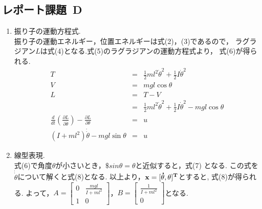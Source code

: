 \documentclass[twocolumn, 10pt,a4j]{jsarticle}
\begin{document}
  \subsection{レポート課題~D}
    \begin{enumerate}
      \item 振り子の運動方程式. \\
        振り子の運動エネルギー，位置エネルギーは式(2)，(3)であるので，
        ラグラジアン$L$は式(4)となる.式(5)のラグラジアンの運動方程式より，
        式(6)が得られる.
        \begin{eqnarray}
          T &=& \frac{1}{2} m l^{2} \dot{\theta}^{2} + \frac{1}{2} I \dot{\theta}^{2} \\
          V &=& mgl \cos \theta \\
          L &=& T - V  \\ \nonumber
          &=& \frac{1}{2} m l^{2} \dot{\theta}^{2} + \frac{1}{2} I \dot{\theta}^{2} - mgl \cos \theta \\
          \frac{d}{dt}\left( \frac{\partial L}{\partial \dot{\theta}} \right) - \frac{\partial L}{\partial \theta} &=& u \\
          (I + ml^{2})\dot{\dot{\theta}} - mgl \sin \theta &=& u
        \end{eqnarray}

      \item 線型表現. \\
        式(6)で角度$\theta$が小さいとき，$\$sin \theta = \theta$と近似すると，式(7)
        となる. この式を$\dot{\dot{\theta}}$について解くと式(8)となる.
        以上より，$\bf{x} = [\dot{\theta}, \theta]^{T}$とすると, 式(8)が得られる.
        よって，$A = \left[
          \begin{array}{cc}
            0 & \frac{mgl}{I+ml^{2}} \\
            1 & 0
          \end{array}
        \right]$，$B = \left[
          \begin{array}{c}
            \frac{1}{I+ml^{2}} \\
            0
          \end{array}
        \right]$となる.


\end{enumerate}
\end{document}
